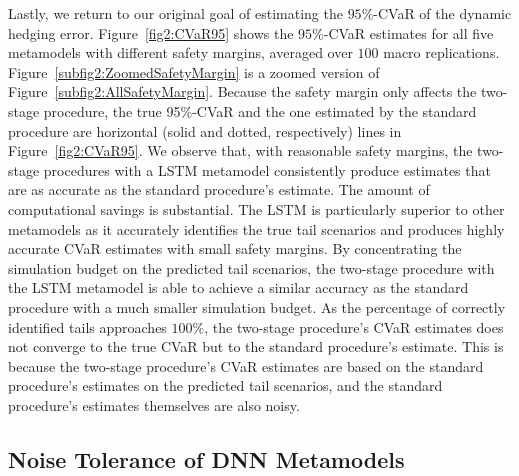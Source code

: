 Lastly, we return to our original goal of estimating the $95\%$-CVaR of the dynamic hedging error.
Figure~\ref{fig2:CVaR95} shows the $95\%$-CVaR estimates for all five metamodels with different safety margins, averaged over $100$ macro replications.
Figure~\ref{subfig2:ZoomedSafetyMargin} is a zoomed version of Figure~\ref{subfig2:AllSafetyMargin}.
Because the safety margin only affects the two-stage procedure, the true 95\%-CVaR and the one estimated by the standard procedure are horizontal (solid and dotted, respectively) lines in Figure~\ref{fig2:CVaR95}. 
We observe that, with reasonable safety margins, the two-stage procedures with a LSTM metamodel consistently produce estimates that are as accurate as the standard procedure's estimate.
The amount of computational savings is substantial.
The LSTM is particularly superior to other metamodels as it accurately identifies the true tail scenarios and produces highly accurate CVaR estimates with small safety margins.
By concentrating the simulation budget on the predicted tail scenarios, the two-stage procedure with the LSTM metamodel is able to achieve a similar accuracy as the standard procedure with a much smaller simulation budget.
As the percentage of correctly identified tails approaches $100\%$, the two-stage procedure's CVaR estimates does not converge to the true CVaR but to the standard procedure's estimate.
This is because the two-stage procedure's CVaR estimates are based on the standard procedure's estimates on the predicted tail scenarios, and the standard procedure's estimates themselves are also noisy.

\subsection{Noise Tolerance of DNN Metamodels} \label{subsec2:noiseTolerance}

